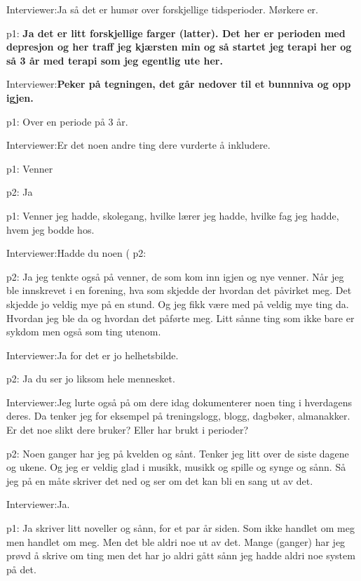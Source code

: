 \documentclass[11pt, norsk, a4paper]{article}
\begin{document}
\textcolor{myBlue} {Interviewer:}Ja så det er humør over forskjellige tidsperioder. Mørkere er. 

\textcolor{myGreen} {p1:} \textbf{Ja det er litt forskjellige farger (latter). Det her er perioden med depresjon og her traff jeg kjærsten min og så startet jeg terapi her og så 3 år med terapi som jeg egentlig ute her.}

\textcolor{myBlue} {Interviewer:}\textbf{Peker på tegningen, det går nedover til et bunnniva og opp igjen.}

\textcolor{myGreen} {p1:} Over en periode på 3 år.

\textcolor{myBlue} {Interviewer:}Er det noen andre ting dere vurderte å inkludere. 

\textcolor{myGreen} {p1:} Venner

\textcolor{myYellow} {p2:} Ja

\textcolor{myGreen} {p1:} Venner jeg hadde, skolegang, hvilke lærer jeg hadde, hvilke fag jeg hadde, hvem jeg bodde hos.

\textcolor{myBlue} {Interviewer:}Hadde du noen (
\textcolor{myYellow} {p2:}

\textcolor{myYellow} {p2:} Ja jeg tenkte også på venner, de som kom inn igjen og nye venner. Når jeg ble innskrevet i en forening, hva som skjedde der hvordan det påvirket meg. Det skjedde jo veldig mye på en stund. Og jeg fikk være med på veldig mye ting da. Hvordan jeg ble da og hvordan det påførte meg. Litt sånne ting som ikke bare er sykdom men også som ting utenom.

\textcolor{myBlue} {Interviewer:}Ja for det er jo helhetsbilde.

\textcolor{myYellow} {p2:} Ja du ser jo liksom hele mennesket.

\textcolor{myBlue} {Interviewer:}Jeg lurte også på om dere idag dokumenterer noen ting i hverdagens deres. Da tenker jeg for eksempel på treningslogg, blogg, dagbøker, almanakker. Er det noe slikt dere bruker? Eller har brukt i perioder?

\textcolor{myYellow} {p2:} Noen ganger har jeg på kvelden og sånt. Tenker jeg litt over de siste dagene og ukene. Og jeg er veldig glad i musikk, musikk og spille og synge og sånn. Så jeg på en måte skriver det ned og ser om det kan bli en sang ut av det.

\textcolor{myBlue} {Interviewer:}Ja.

\textcolor{myGreen} {p1:} Ja skriver litt noveller og sånn, for et par år siden. Som ikke handlet om meg men handlet om meg. Men det ble aldri noe ut av det. Mange (ganger) har jeg prøvd å skrive om ting men det har jo aldri gått sånn jeg hadde aldri noe system på det. 
\end{document}
